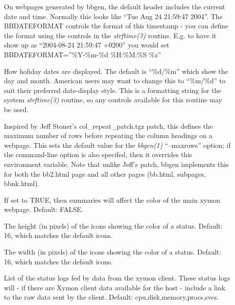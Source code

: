 \begin{description}
 

\item[] On webpages generated by bbgen, the
  default header includes the current date and time. Normally this
  looks like ``Tue Aug 24 21:59:47 2004''. The BBDATEFORMAT controls
  the format of this timestamp - you can define the format using the
  controls in the \emph{strftime(3)} routine. E.g. to have it show up
  as ``2004-08-24 21:59:47 +0200'' you would set
  BBDATEFORMAT=''\%Y-\%m-\%d \%H:\%M:\%S \%z'' 


 

\item[] How holiday dates are displayed. The
  default is ``\%d/\%m'' which show the day and month. American users
  may want to change this to ``\%m/\%d'' to suit their preferred
  date-display style. This is a formatting string for the system
  \emph{strftime(3)} routine, so any controls available for this
  routine may be used. 


 

\item[] Inspired by Jeff Stoner's
  col\_repeat\_patch.tgz patch, this defines the maximum number of
  rows before repeating the column headings on a webpage. This sets
  the default value for the \emph{bbgen(1)} ``--maxrows'' option; if
  the command-line option is also specifed, then it overrides this
  environment variable. Note that unlike Jeff's patch, bbgen
  implements this for both the bb2.html page and all other pages
  (bb.html, subpages, bbnk.html). 


 

\item[] If set to TRUE, then summaries will
  affect the color of the main xymon webpage. Default: FALSE. 


 

\item[] The height (in pixels) of the icons showing
  the color of a status. Default: 16, which matches the default
  icons. 


 

\item[] The width (in pixels) of the icons showing the
  color of a status. Default: 16, which matches the default icons. 


 

\item[] List of the status logs fed by data from the
  xymon client. These status logs will - if there are Xymon client
  data available for the host - include a link to the raw data sent by
  the client. Default: cpu,disk,memory,procs,svcs. 



\end{description}
